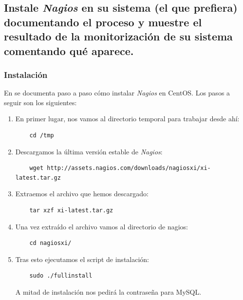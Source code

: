 \documentclass[10pt,a4paper,spanish]{article}
\numberwithin{equation}{section} %
\numberwithin{figure}{section} %
\numberwithin{table}{section} %
\begin{document}
\subsection{Instale \textit{Nagios} en su sistema (el que prefiera) documentando el proceso y muestre el resultado de la monitorización de su sistema comentando qué aparece.}
\subsubsection{Instalación}
En \cite{installnagios} se documenta paso a paso cómo instalar \textit{Nagios} en CentOS. Los pasos a seguir son los siguientes:
\begin{enumerate}[1.]
    \item En primer lugar, nos vamos al directorio temporal para trabajar desde ahí:
    \begin{verbatim}
    cd /tmp
    \end{verbatim}

    \item Descargamos la última versión estable de \textit{Nagios}:
    \begin{verbatim}
    wget http://assets.nagios.com/downloads/nagiosxi/xi-latest.tar.gz
    \end{verbatim}

    \item Extraemos el archivo que hemos descargado:
    \begin{verbatim}
    tar xzf xi-latest.tar.gz
    \end{verbatim}

    \item Una vez extraído el archivo vamos al directorio de nagios:
    \begin{verbatim}
    cd nagiosxi/
    \end{verbatim}

    \item Tras esto ejecutamos el script de instalación:
    \begin{verbatim}
    sudo ./fullinstall
    \end{verbatim}

    A mitad de instalación nos pedirá la contraseña para MySQL.


\end{enumerate}
\end{document}
